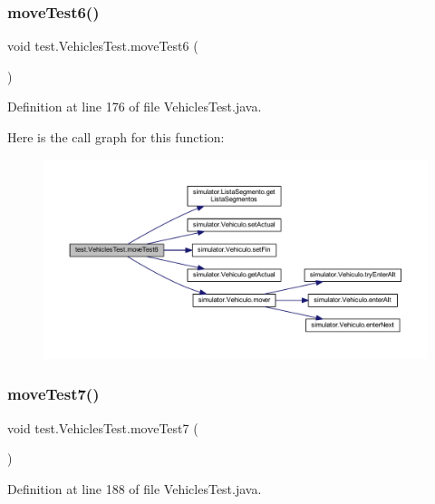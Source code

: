 \subsubsection{\texorpdfstring{move\+Test6()}{moveTest6()}}
{\footnotesize\ttfamily void test.\+Vehicles\+Test.\+move\+Test6 (\begin{DoxyParamCaption}{ }\end{DoxyParamCaption})}



Definition at line 176 of file Vehicles\+Test.\+java.

Here is the call graph for this function\+:\nopagebreak
\begin{figure}[H]
\begin{center}
\leavevmode
\includegraphics[width=350pt]{classtest_1_1_vehicles_test_add2a427b283ac60b944e500f0c66e20b_cgraph}
\end{center}
\end{figure}
\mbox{\label{classtest_1_1_vehicles_test_ac0fe870f7fb0e6bd96317b5e8a9c06d0}} 
\subsubsection{\texorpdfstring{move\+Test7()}{moveTest7()}}
{\footnotesize\ttfamily void test.\+Vehicles\+Test.\+move\+Test7 (\begin{DoxyParamCaption}{ }\end{DoxyParamCaption})}



Definition at line 188 of file Vehicles\+Test.\+java.

